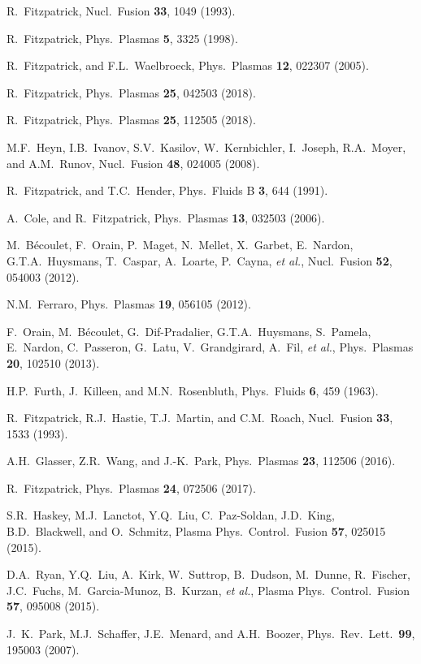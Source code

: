 \documentclass[12pt,prb,aps]{revtex4-1}
\begin{document}
\begin{thebibliography}{99}
 R.~Fitzpatrick, Nucl.\ Fusion {\bf 33}, 1049 (1993).

 R.~Fitzpatrick, Phys.\ Plasmas {\bf 5}, 3325 (1998).

 R.~Fitzpatrick, and F.L.~Waelbroeck, Phys.\ Plasmas {\bf 12}, 022307 (2005).

 R.~Fitzpatrick, Phys.\ Plasmas {\bf 25}, 042503 (2018).

 R.~Fitzpatrick, Phys.\ Plasmas {\bf 25}, 112505 (2018).

 M.F.~Heyn, I.B.~Ivanov, S.V.~Kasilov, W.~Kernbichler, I.~Joseph, R.A.~Moyer,  and A.M.~Runov, Nucl.\ Fusion {\bf 48}, 024005 (2008). 

 R.~Fitzpatrick, and T.C.~Hender, Phys.\ Fluids B {\bf 3}, 644 (1991).

 A.~Cole, and R.~Fitzpatrick, Phys.\ Plasmas {\bf 13}, 032503 (2006).

 M.~B\'{e}coulet, F.~Orain, P.~Maget, N.~Mellet, X.~Garbet, E.~Nardon, G.T.A.~Huysmans, T.~Caspar, A.~Loarte,  P.~Cayna, {\em et al.}, 
Nucl.\ Fusion {\bf 52}, 054003  (2012).

 N.M.~Ferraro, Phys.\ Plasmas {\bf 19}, 056105  (2012).

 F.~Orain, M.~B\'{e}coulet, G.~Dif-Pradalier, G.T.A.~Huysmans, S.~Pamela,   E.~Nardon, C.~Passeron, G.~Latu, V.~Grandgirard, A.~Fil, {\em et al.}, 
Phys.\ Plasmas {\bf 20}, 102510 (2013). 

 H.P.~Furth,  J.~Killeen, and M.N.~Rosenbluth,  Phys.\ Fluids {\bf 6}, 459 (1963).

 R.~Fitzpatrick, R.J.~Hastie, T.J.~Martin, and C.M.~Roach, Nucl.\ Fusion {\bf 33}, 1533 (1993).

 A.H.~Glasser, Z.R.~Wang, and J.-K.~Park, Phys.\ Plasmas {\bf 23}, 112506 (2016).

 R.~Fitzpatrick, Phys.\ Plasmas {\bf 24}, 072506 (2017). 

 S.R.~Haskey, M.J.~Lanctot, Y.Q.~Liu, C.~Paz-Soldan, J.D.~King, B.D.~Blackwell, and O.~Schmitz,  Plasma 
Phys.\ Control.\ Fusion {\bf 57}, 025015 (2015).

 D.A.~Ryan,  Y.Q.~Liu, A.~Kirk, W.~Suttrop, B.~Dudson, M.~Dunne, R.~Fischer, J.C.~Fuchs, M.~Garcia-Munoz, B.~Kurzan, {\it et al.}, 
Plasma Phys.\ Control.\ Fusion {\bf 57}, 095008 (2015).

 J.~K.~Park, M.J.~Schaffer, J.E.~Menard, and A.H.~Boozer, Phys.\ Rev.\ Lett.\ {\bf 99}, 195003 (2007).


\end{thebibliography}
\end{document}
